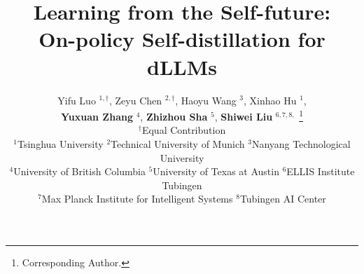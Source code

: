 \documentclass{article}
\title{Learning from the Self-future: \\
On-policy Self-distillation for dLLMs}
\author{%
  Yifu Luo $^{1, \dagger}$,
  Zeyu Chen $^{2, \dagger}$,
  Haoyu Wang $^{3}$,
  Xinhao Hu $^{1}$,
  \\
  \textbf{Yuxuan Zhang} $^{4}$,
  \textbf{Zhizhou Sha} $^{5}$,
  \textbf{Shiwei Liu} $^{6, 7, 8, }$ \thanks{Corresponding Author.}
  \\
  $^{\dagger}$Equal Contribution 
  \vspace{4pt}
  \\
  $^{1}$Tsinghua University \vspace{.1em} \hspace{4pt} $^{2}$Technical University of Munich \vspace{.1em} \hspace{4pt} $^{3}$Nanyang Technological University \vspace{.1em} \hspace{4pt}
  \\
  $^{4}$University of British Columbia \vspace{.1em} \hspace{4pt} $^{5}$University of Texas at Austin \vspace{.1em} \hspace{4pt} 
  $^{6}$ELLIS Institute Tubingen \vspace{.1em} \hspace{4pt}
  \\
  $^{7}$Max Planck Institute for Intelligent Systems \vspace{.1em} \hspace{4pt}
  $^{8}$Tubingen AI Center \vspace{.1em} \hspace{4pt}
}
\begin{document}
\newcommand{\question}[2]{%
\begin{tcolorbox}[
    enhanced,
    colback=white,
    colframe=white,
    leftrule=0.4mm,
    rightrule=0.4mm,
    toprule=0.4mm,
    bottomrule=0.4mm,
    arc=0mm,
    left=0pt,
    right=0pt,
    top=2pt,
    bottom=2pt,
    breakable,
    borderline north={0.4mm}{0pt}{myblue},
    borderline south={0.4mm}{0pt}{myblue}
]
{\textbf{\textcolor{myblue}{Question:}}} #1 \\
{\textbf{\textcolor{myblue}{Answer:}}} #2
\end{tcolorbox}
}

\newcommand{\twoquestion}[4]{%
\begin{tcolorbox}[
    enhanced,
    colback=white,
    colframe=white,
    leftrule=0.4mm,
    rightrule=0.4mm,
    toprule=0.4mm,
    bottomrule=0.4mm,
    arc=0mm,
    left=0pt,
    right=0pt,
    top=2pt,
    bottom=2pt,
    breakable,
    borderline north={0.4mm}{0pt}{myblue},
    borderline south={0.4mm}{0pt}{myblue}
]
{\textbf{\textcolor{myblue}{Question:}}} #1 \\
{\textbf{\textcolor{myblue}{Answer:}}} #2 \\
\\
{\textbf{\textcolor{myblue}{Question:}}} #3 \\
{\textbf{\textcolor{myblue}{Answer:}}} #4
\end{tcolorbox}
}

\newcommand{\multiquestion}[8]{%
\begin{tcolorbox}[
    enhanced,
    colback=white,
    colframe=white,
    leftrule=0.4mm,
    rightrule=0.4mm,
    toprule=0.4mm,
    bottomrule=0.4mm,
    arc=0mm,
    left=0pt,
    right=0pt,
    top=2pt,
    bottom=2pt,
    breakable,
    borderline north={0.4mm}{0pt}{myblue},
    borderline south={0.4mm}{0pt}{myblue}
]
{\textbf{\textcolor{myblue}{Question:}}} #1 \\
{\textbf{\textcolor{myblue}{Answer:}}} #2 \\
\\
{\textbf{\textcolor{myblue}{Question:}}} #3 \\
{\textbf{\textcolor{myblue}{Answer:}}} #4 \\
\\
{\textbf{\textcolor{myblue}{Question:}}} #5 \\
{\textbf{\textcolor{myblue}{Answer:}}} #6 \\
\\
{\textbf{\textcolor{myblue}{Question:}}} #7 \\
{\textbf{\textcolor{myblue}{Answer:}}} #8
\end{tcolorbox}
}
\end{document}
